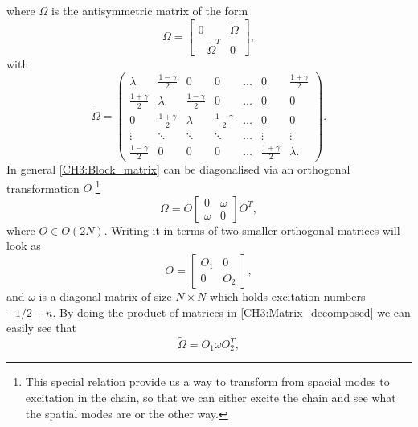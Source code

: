 where $\Omega$ is the antisymmetric matrix of the form
\begin{equation}
\Omega=\left[\begin{array}{c|c}
0 & \tilde{\Omega} \\
\hline -\tilde{\Omega}^{T} & 0
\end{array}\right],
\label{CH3:Block_matrix}
\end{equation}
with 
\begin{equation}
\tilde{\Omega}=\begin{pmatrix}
\lambda & \frac{1-\gamma}{2} & 0 &0 &\ldots  &0 &\frac{1+\gamma}{2}\\
\frac{1+\gamma}{2} & \lambda & \frac{1-\gamma}{2} & 0 &\ldots &0 &0\\
0 & \frac{1+\gamma}{2} & \lambda & \frac{1-\gamma}{2} &\ldots &0 &0\\
\vdots& \ddots & \ddots & \ddots & \ldots &  \vdots & \vdots\\
\frac{1-\gamma}{2}&0&0&0&\ldots & \frac{1+\gamma}{2} & \lambda.
\end{pmatrix}.
\label{CH3:Hamiltonian_matrix_XY_model}
\end{equation}
In general \eqref{CH3:Block_matrix} can be diagonalised via an orthogonal transformation $O$\cite{botero_bcs-like_2004,latorre_ground_2004} \footnote{This special relation provide us a way to transform from spacial modes to excitation in the chain, so that we can either excite the chain and see what the spatial modes are or the other way.}
\begin{equation}
    \Omega=O\left[\begin{array}{c|c}
0 & \omega \\
\hline \omega & 0
\end{array}\right] O^T,
\label{CH3:Matrix_decomposed}
\end{equation}
where $O\in O(2N)$.  Writing it in terms of two smaller orthogonal matrices will look as
\begin{equation}
O=\left[\begin{array}{c|c}
O_1 & 0 \\
\hline 0 & O_2
\end{array}\right],
\end{equation}
and $\omega$ is a diagonal matrix of size $N\times N$ which holds excitation numbers $-1/2+n$. By doing the product of matrices in \eqref{CH3:Matrix_decomposed} we can easily see that 
\begin{equation}
    \tilde{\Omega}=O_1 \omega O_2^T,
\end{equation}
